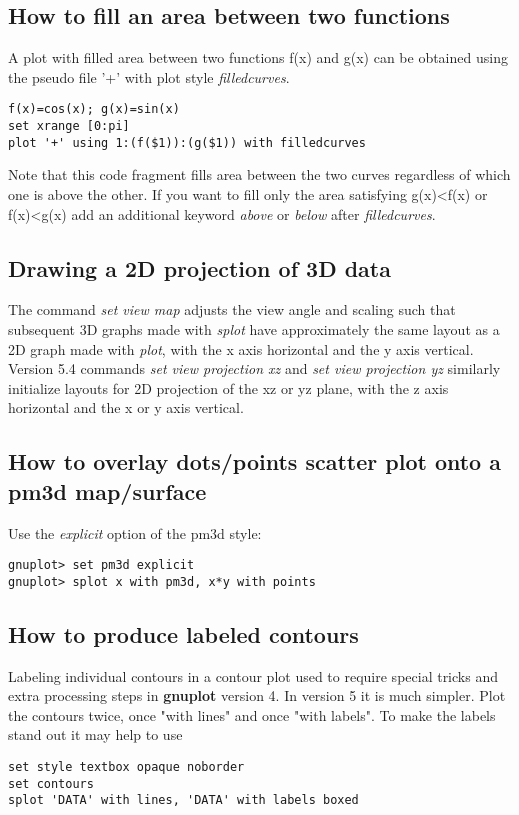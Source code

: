 \documentclass[letter,11pt]{article}
\newcommand{\gnuplot}{\textbf{gnuplot }}
\begin{document}
{\subsection{How to fill an area between two functions}

A plot with filled area between two functions f(x) and g(x) can be obtained using
the pseudo file '+' with  plot style {\em filledcurves}.
\small
\begin{verbatim}
f(x)=cos(x); g(x)=sin(x)
set xrange [0:pi]
plot '+' using 1:(f($1)):(g($1)) with filledcurves
\end{verbatim}
\normalsize

Note that this code fragment fills area between the two curves regardless of
which one is above the other.  If you want to fill only the area satisfying g(x)<f(x)
or f(x)<g(x)
add an additional keyword {\em above} or {\em below} after {\em filledcurves}.



\subsection{Drawing a 2D projection of 3D data}

The command {\em set view map} adjusts the view angle and scaling such
that subsequent 3D graphs made with {\em splot} have approximately the same layout
as a 2D graph made with {\em plot}, with the x axis horizontal and the y axis vertical.
Version 5.4 commands {\em set view projection xz} and {\em set view projection yz}
similarly initialize layouts for 2D projection of the xz or yz plane, with the
z axis horizontal and the x or y axis vertical.

\subsection{How to overlay dots/points scatter plot onto a pm3d map/surface}

Use the {\em explicit} option of the pm3d style:
\small
\begin{verbatim}
gnuplot> set pm3d explicit
gnuplot> splot x with pm3d, x*y with points
\end{verbatim}
\normalsize


\subsection{How to produce labeled contours}

Labeling individual contours in a contour plot used to require special
tricks and extra processing steps in \gnuplot version 4.
In version 5 it is much simpler.  Plot the contours twice,
once "with lines" and once "with labels".  To make the labels stand out
it may help to use
\begin{verbatim}
set style textbox opaque noborder
set contours
splot 'DATA' with lines, 'DATA' with labels boxed
\end{verbatim}

}
\end{document}

